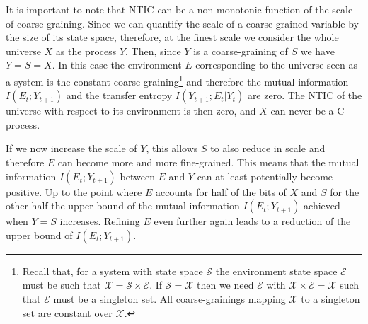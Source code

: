 \documentclass[utf8]{article}
\newcommand{\X}{\mathcal{X}}
\renewcommand{\S}{\mathcal{S}}
\newcommand{\E}{\mathcal{E}}
\begin{document}
    		It is important to note that NTIC can be a non-monotonic function of the scale of coarse-graining. Since we can quantify the scale of a coarse-grained variable by the size of its state space, therefore, at the finest scale we consider the whole universe $X$ as the process $Y$. Then, since $Y$ is a coarse-graining of $S$ we have $Y=S=X$. In this case the environment $E$ corresponding to the universe seen as a system is the constant coarse-graining\footnote{Recall that, for a system with state space $\S$ the environment state space $\E$ must be such that $\X=\S \times \E$. If $\S =\X$ then we need $\E$ with $\X \times \E=\X$ such that $\E$ must be a singleton set. All coarse-grainings mapping $\X$ to a singleton set are constant over $\X$.} and therefore the mutual information $I(E_t;Y_{t+1})$ and the transfer entropy $I(Y_{t+1};E_t|Y_t)$ are zero. The NTIC of the universe with respect to its environment is then zero, and $X$ can never be a C-process.
    		
    		If we now increase the scale of $Y$, this allows $S$ to also reduce in scale and therefore $E$ can become more and more fine-grained. This means that the mutual information $I(E_t;Y_{t+1})$ between $E$ and $Y$ can at least potentially become positive. Up to the point where $E$ accounts for half of the bits of $X$ and $S$ for the other half the upper bound of the mutual information $I(E_t;Y_{t+1})$ achieved when $Y=S$ increases. Refining $E$ even further again leads to a reduction of the upper bound of $I(E_t;Y_{t+1})$.
    		
\end{document}
